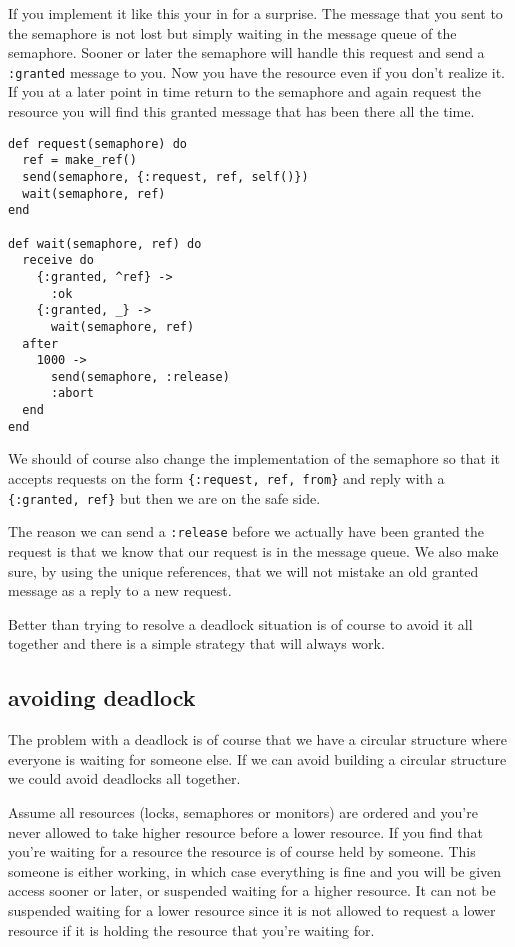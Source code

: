 \documentclass[a4paper,11pt]{article}
\begin{document}
If you implement it like this your in for a surprise. The message that
you sent to the semaphore is not lost but simply waiting in the
message queue of the semaphore. Sooner or later the semaphore will
handle this request and send a {\tt :granted} message to you. Now you
have the resource even if you don't realize it. If you at a later point
in time return to the semaphore and again request the resource you
will find this granted message that has been there all the time.

\begin{verbatim}
def request(semaphore) do
  ref = make_ref()
  send(semaphore, {:request, ref, self()})
  wait(semaphore, ref)
end

def wait(semaphore, ref) do
  receive do
    {:granted, ^ref} ->
      :ok
    {:granted, _} ->
      wait(semaphore, ref)
  after
    1000 ->
      send(semaphore, :release)
      :abort
  end
end
\end{verbatim}

We should of course also change the implementation of the semaphore so
that it accepts requests on the form {\tt \{:request, ref, from\}} and
reply with a {\tt \{:granted, ref\}} but then we are on the safe side.

The reason we can send a {\tt :release} before we actually have been
granted the request is that we know that our request is in the message
queue. We also make sure, by using the unique references, that we will
not mistake an old granted message as a reply to a new request. 

Better than trying to resolve a deadlock situation is of course to
avoid it all together and there is a simple strategy that will always work. 


\subsection{avoiding deadlock}

The problem with a deadlock is of course that we have a circular
structure where everyone is waiting for someone else. If we can avoid
building a circular structure we could avoid deadlocks all together.

Assume all resources (locks, semaphores or monitors) are ordered and
you're never allowed to take higher resource before a lower
resource. If you find that you're waiting for a resource the resource
is of course held by someone. This someone is either working, in which
case everything is fine and you will be given access sooner or later,
or suspended waiting for a higher resource. It can not be suspended
waiting for a lower resource since it is not allowed to request a
lower resource if it is holding the resource that you're waiting for.
\end{document}
